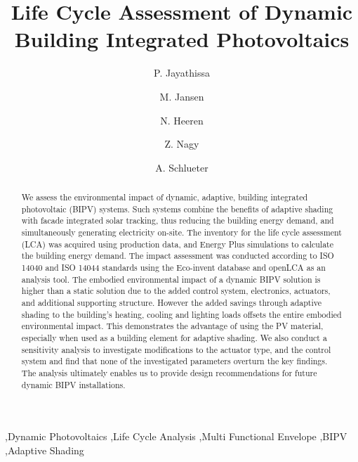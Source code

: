 \documentclass[preprint,12pt]{elsarticle} %
\begin{document}
\begin{frontmatter}

\title{Life Cycle Assessment of Dynamic Building Integrated Photovoltaics} 

\author[ita]{P. Jayathissa }
\address[ita]{Architecture and Building Systems, Institute of Technology in Architecture, Department of Architecture, ETH Zurich, Switzerland} 

\author[ita]{M. Jansen}

\author[baug]{N. Heeren}
\address[baug]{Ecological System Design, Institute of Environmental Engineering,\\ ETH Zurich, Switzerland}

\author[ita]{Z. Nagy}



\author[ita]{A. Schlueter  }



\begin{abstract}
We assess the environmental impact of dynamic, adaptive, building integrated photovoltaic (BIPV) systems. Such systems combine the benefits of adaptive shading with facade integrated solar tracking, thus reducing the building energy demand, and simultaneously generating electricity on-site. The inventory for the life cycle assessment (LCA) was acquired using production data, and Energy Plus simulations to calculate the building energy demand. The impact assessment was conducted according to ISO 14040 and ISO 14044 standards using the Eco-invent database and openLCA as an analysis tool. The embodied environmental impact of a dynamic BIPV solution is higher than a static solution due to the added control system, electronics, actuators, and additional supporting structure. However the added savings through adaptive shading to the building's heating, cooling and lighting loads offsets the entire embodied environmental impact. This demonstrates the advantage of using the PV material, especially when used as a building element for adaptive shading. We also conduct a sensitivity analysis to investigate modifications to the actuator type, and the control system and find that none of the investigated parameters overturn the key findings. The analysis ultimately enables us to provide design recommendations for future dynamic BIPV installations. 

\end{abstract}

\begin{keyword}
\sep Dynamic Photovoltaics \sep Life Cycle Analysis \sep Multi Functional Envelope \sep BIPV \sep Adaptive Shading
\end{keyword}

\end{frontmatter}
\end{document}
